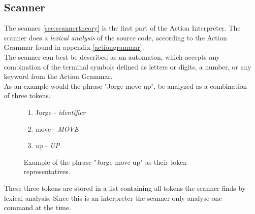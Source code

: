 \subsection{Scanner}
\label{sec:ai_scanner}
The scanner \ref{sec:scannertheory} is the first part of the Action Interpreter. The scanner does a \textit{lexical analysis} of the source code, according to the Action Grammar found in appendix \ref{actiongrammar}.\\
The scanner can best be described as an automaton, which accepts any combination of the terminal symbols defined as letters or digits, a number, or any keyword from the Action Grammar.\\
As an example would the phrase "Jorge move up", be analyzed as a combination of three tokens.\\

\begin{figure}[h]
\begin{enumerate}
\item Jorge - \textit{identifier}
\item move - \textit{MOVE}
\item up - \textit{UP}
\end{enumerate}
\caption{Example of the phrase "Jorge move up" as their token representatives.}
\end{figure}

These three tokens are stored in a list containing all tokens the scanner finds by lexical analysis. Since this is an interpreter the scanner only analyse one command at the time.\\
